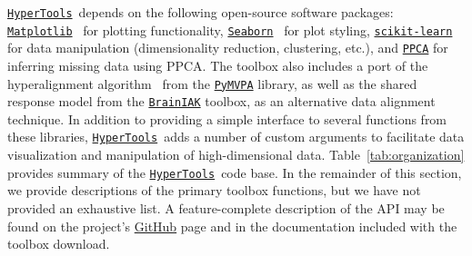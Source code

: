 \documentclass[12pt,letterpaper]{article}
\newcommand{\hypertools}{\href{https://github.com/ContextLab/hypertools}{\texttt{HyperTools}}}
\begin{document}
\hypertools~depends on the following open-source software packages: \href{http://matplotlib.org/}{\texttt{Matplotlib}}~\cite{Hunt07} for plotting functionality, \href{http://seaborn.pydata.org/}{\texttt{Seaborn}}~\cite{WaskEtal16} for plot styling,  \href{https://github.com/scikit\-learn/scikit\-learn}{\texttt{scikit-learn}}~\cite{PedrEtal11} for data manipulation (dimensionality reduction, clustering, etc.), and \href{https://github.com/allentran/pca-magic}{\texttt{PPCA}} for inferring missing data using PPCA.  The toolbox also includes a port of the hyperalignment algorithm~\cite{HaxbEtal11} from the \href{https://github.com/PyMVPA/PyMVPA}{\texttt{PyMVPA}} library, as well as the shared response model from the \href{https://github.com/IntelPNI/brainiak}{\texttt{BrainIAK}} toolbox, as an alternative data alignment technique.  In addition to providing a simple interface to several functions from these libraries, \hypertools~adds a number of custom arguments to facilitate data visualization and manipulation of high-dimensional data. Table~\ref{tab:organization} provides summary of the \hypertools~code base.  In the remainder of this section, we provide descriptions of the primary toolbox functions, but we have not provided an exhaustive list.  A feature-complete description of the API may be found on the project's \href{https://github.com/ContextLab/hypertools}{GitHub} page and in the documentation included with the toolbox download.
\end{document}
